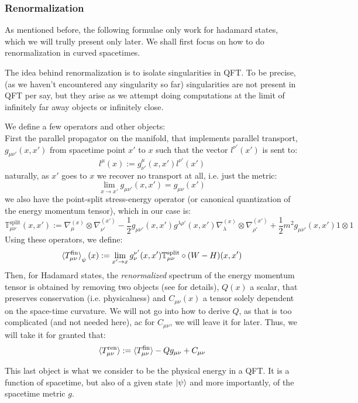 \documentclass[a4paper,11pt]{article}
\numberwithin{equation}{section}
\theoremstyle{definition}
\begin{document}
\subsubsection{Renormalization}
    As mentioned before, the following formulae only work for hadamard states, which we will trully present only later. We shall first focus on how to do renormalization in curved spacetimes. 

    The idea behind renormalization is to isolate singularities in QFT. To be precise, (as we haven't encountered any singularity so far) singularities are not present in QFT per say, but they arise as we attempt doing computations at the limit of infinitely far away objects or infinitely close.

    We define a few operators and other objects:\\
    First the parallel propagator on the manifold, that implements parallel transport, $g_{\mu\nu'}(x,x')$ from spacetime point $x'$ to $x$ such that the vector $l^{\nu'}(x')$ is sent to:
    $$l^{\mu}(x):=g^\mu_{\nu'}(x,x')l^{\nu'}(x')$$
    naturally, as $x'$ goes to $x$ we recover no transport at all, i.e. just the metric:
    $$\lim_{x\to x'} g_{\mu\nu'}(x,x')=g_{\mu\nu}(x')$$
    we also have the point-split stress-energy operator (or canonical quantization of the energy momentum tensor), which in our case is:
    $$\mathbb{T}^\mathrm{split}_{\mu\nu}(x,x'):=\nabla^{(x)}_\mu\otimes\nabla^{(x')}_{\nu'}-\frac{1}{2}g_{\mu\nu'}(x,x')g^{\lambda\rho'}(x,x')\nabla_\lambda^{(x)}\otimes\nabla_{\rho'}^{(x')}+\frac{1}{2}m^2g_{\mu\nu'}(x,x')1\otimes 1$$
    Using these operators, we define:
    $$\braket{T^\mathrm{fin}_{\mu\nu}}_\psi(x):=\lim_{x'\to x} g_\nu^{\nu'}(x,x')\mathbb{T}^\mathrm{split}_{\mu\nu}\circ(W-H)(x,x')$$
    Then, for Hadamard states, the \emph{renormalized} spectrum of the energy momentum tensor is obtained by removing two objects (see \cite{QCRenorm} for details), $Q(x)$ a scalar, that preserves conservation (i.e. physicalness) and $C_{\mu\nu}(x)$ a tensor solely dependent on the space-time curvature. We will not go into how to derive $Q$, as that is too complicated (and not needed here), ac for $C_{\mu\nu}$, we will leave it for later. Thus, we will take it for granted that:
    \begin{equation}
    \braket{T^\mathrm{ren}_{\mu\nu}}:=\braket{T^\mathrm{fin}_{\mu\nu}}-Qg_{\mu\nu} + C_{\mu\nu}
    \end{equation}
    
    This last object is what we consider to be the physical energy in a QFT. It is a function of spacetime, but also of a given state $\ket{\psi}$ and more importantly, of the spacetime metric $g$.
\end{document}
